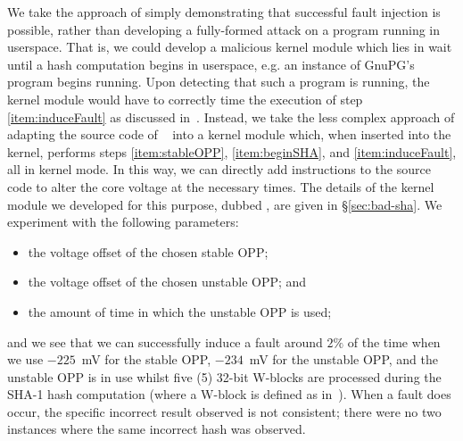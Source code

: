 We take the approach of simply demonstrating that successful fault injection is
possible, rather than developing a fully-formed attack on a program running in
userspace. That is, we could develop a malicious kernel module which lies in
wait until a hash computation begins in userspace, e.g. an
instance of GnuPG's  program begins running. Upon detecting that
such a program is running, the kernel module would have to correctly time the
execution of step \ref{item:induceFault} as discussed in~\cite[§3.5]{clkscrew}.
Instead, we take the less complex approach of adapting the source code of
~\cite{gnupgSHA} into a kernel module which, when inserted into
the kernel, performs steps \ref{item:stableOPP}, \ref{item:beginSHA}, and
\ref{item:induceFault}, all in kernel mode. In this way, we can directly add
instructions to the  source code to alter the core voltage at
the necessary times. The details of the kernel module we developed for this
purpose, dubbed , are given in §\ref{sec:bad-sha}. We experiment
with the following parameters:

\begin{itemize}
    \item the voltage offset of the chosen stable OPP;
    \item the voltage offset of the chosen unstable OPP; and
    \item the amount of time in which the unstable OPP is used;
\end{itemize}
and we see that we can successfully induce a fault around $2\%$ of
the time when we use $-225$~mV for the stable OPP, $-234$~mV for the unstable
OPP, and the unstable OPP is in use whilst five (5) 32-bit W-blocks are processed
during the SHA-1 hash computation (where a W-block is defined as in~\cite[§6.1]{rfcSHA}).
When a fault does occur, the specific incorrect result observed is not consistent;
there were no two instances where the same incorrect hash was observed.
